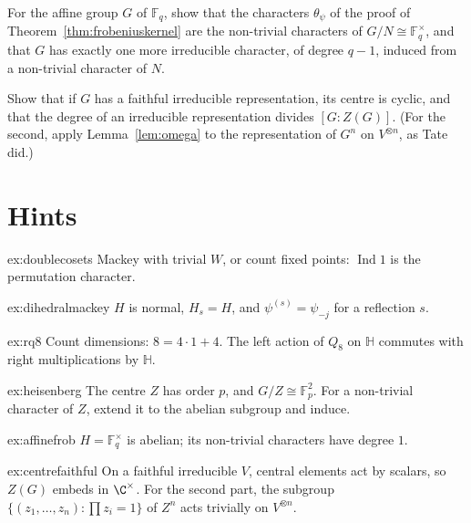 \begin{exercise}[$\star\star$]\label{ex:affinefrob}
For the affine group $G$ of $\mathbb F_q$, show that the characters $\theta_\psi$ of the proof of Theorem~\ref{thm:frobeniuskernel} are the non-trivial characters of $G/N\cong\mathbb F_q^\times$, and that $G$ has exactly one more irreducible
character, of degree $q-1$, induced from a non-trivial character of $N$.
\end{exercise}

\begin{exercise}[$\star\star\star$]\label{ex:centrefaithful}
Show that if $G$ has a faithful irreducible representation, its centre is cyclic, and that the degree of an irreducible representation divides $[G:Z(G)]$. (For the second, apply Lemma~\ref{lem:omega} to the representation of
$G^n$ on $V^{\otimes n}$, as Tate did.)
\end{exercise}

\section{Hints}

\begin{hint}{ex:doublecosets}
Mackey with trivial $W$, or count fixed points: $\operatorname{Ind}1$ is the permutation character.
\end{hint}

\begin{hint}{ex:dihedralmackey}
$H$ is normal, $H_s=H$, and $\psi^{(s)}=\psi_{-j}$ for a reflection $s$.
\end{hint}

\begin{hint}{ex:rq8}
Count dimensions: $8=4\cdot1+4$. The left action of $Q_8$ on $\mathbb H$ commutes with right multiplications by $\mathbb H$.
\end{hint}

\begin{hint}{ex:heisenberg}
The centre $Z$ has order $p$, and $G/Z\cong\mathbb F_p^2$. For a non-trivial character of $Z$, extend it to the abelian subgroup and induce.
\end{hint}

\begin{hint}{ex:affinefrob}
$H=\mathbb F_q^\times$ is abelian; its non-trivial characters have degree $1$.
\end{hint}

\begin{hint}{ex:centrefaithful}
On a faithful irreducible $V$, central elements act by scalars, so $Z(G)$ embeds in $\C^\times$. For the second part, the subgroup $\{(z_1,\dots,z_n):\prod z_i=1\}$ of $Z^n$ acts trivially on $V^{\otimes n}$.
\end{hint}

